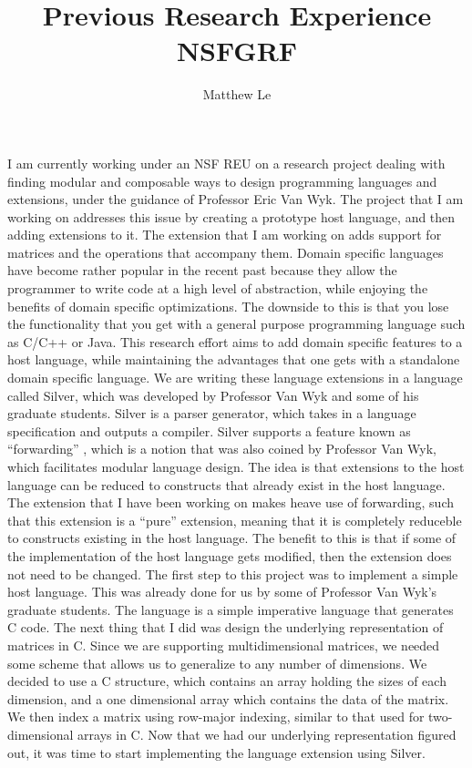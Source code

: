 \documentclass[a4paper,12pt]{article}
\title{Previous Research Experience NSFGRF \vspace{-1ex}}
\author{Matthew Le\vspace{-5ex}}
\newcommand{\tab}{\hspace*{2em}}
\begin{document}
\maketitle

I am currently working under an NSF REU on a research project dealing with finding modular and composable ways to design programming languages and extensions, under the guidance of Professor Eric Van Wyk.  The project that I am working on addresses this issue by creating a prototype host language, and then adding extensions to it.  The extension that I am working on adds support for matrices and the operations that accompany them.  Domain specific languages have become rather popular in the recent past because they allow the programmer to write code at a high level of abstraction, while enjoying the benefits of domain specific optimizations.  The downside to this is that you lose the functionality that you get with a general purpose programming language such as C/C++ or Java.  This research effort aims to add domain specific features to a host language, while maintaining the advantages that one gets with a standalone domain specific language. \newline
\tab We are writing these language extensions in a language called Silver, which was developed by Professor Van Wyk and some of his graduate students.  Silver is a parser generator, which takes in a language specification and outputs a compiler.  Silver supports a feature known as ``forwarding'' , which is a notion that was also coined by Professor Van Wyk, which facilitates modular language design.  The idea is that extensions to the host language can be reduced to constructs that already exist in the host language.  The extension that I have been working on makes heave use of forwarding, such that this extension is a ``pure'' extension, meaning that it is completely reduceble to constructs existing in the host language.  The benefit to this is that if some of the implementation of the host language gets modified, then the extension does not need to be changed.  \newline
\tab The first step to this project was to implement a simple host language.  This was already done for us by some of Professor Van Wyk's graduate students.  The language is a simple imperative language that generates C code.  The next thing that I did was design the underlying representation of matrices in C.  Since we are supporting multidimensional matrices, we needed some scheme that allows us to generalize to any number of dimensions.  We decided to use a C structure, which contains an array holding the sizes of each dimension, and a one dimensional array which contains the data of the matrix.  We then index a matrix using row-major indexing, similar to that used for two-dimensional arrays in C.  Now that we had our underlying representation figured out, it was time to start implementing the language extension using Silver.  \newline
\end{document}
